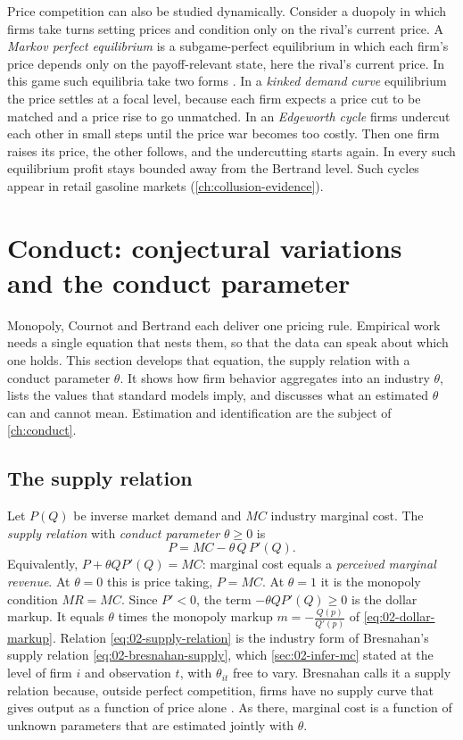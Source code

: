 Price competition can also be studied dynamically. Consider a duopoly in which firms take turns setting prices and
condition only on the rival's current price. A \emph{Markov perfect equilibrium} is a subgame-perfect equilibrium in
which each firm's price depends only on the payoff-relevant state, here the rival's current price. In this game such
equilibria take two forms \citep[pp.~571--572]{MaskinTirole1988}. In a \emph{kinked demand curve} equilibrium the
price settles at a focal level, because each firm expects a price cut to be matched and a price rise to go unmatched.
In an \emph{Edgeworth cycle} firms undercut each other in small steps until the price war becomes too costly. Then
one firm raises its price, the other follows, and the undercutting starts again. In every such equilibrium profit
stays bounded away from the Bertrand level. Such cycles appear in retail gasoline markets
(\cref{ch:collusion-evidence}).

\section{Conduct: conjectural variations and the conduct parameter}\label{sec:02-conduct}

Monopoly, Cournot and Bertrand each deliver one pricing rule. Empirical work needs a single equation that nests them,
so that the data can speak about which one holds. This section develops that equation, the supply relation with a
conduct parameter $\theta$. It shows how firm behavior aggregates into an industry $\theta$, lists the values that
standard models imply, and discusses what an estimated $\theta$ can and cannot mean. Estimation and identification
are the subject of \cref{ch:conduct}.

\subsection{The supply relation}\label{sec:02-supply-relation}

Let $P(Q)$ be inverse market demand and $MC$ industry marginal cost. The \emph{supply relation} with \emph{conduct
parameter} $\theta \ge 0$ is
\begin{equation}\label{eq:02-supply-relation}
P = MC - \theta\, Q\, P'(Q) .
\end{equation}
Equivalently, $P + \theta Q P'(Q) = MC$: marginal cost equals a \emph{perceived marginal revenue}. At $\theta = 0$
this is price taking, $P = MC$. At $\theta = 1$ it is the monopoly condition $MR = MC$. Since $P' < 0$, the term
$-\theta Q P'(Q) \ge 0$ is the dollar markup. It equals $\theta$ times the monopoly markup $m = -\frac{Q(p)}{Q'(p)}$
of \eqref{eq:02-dollar-markup}. Relation \eqref{eq:02-supply-relation} is the industry form of Bresnahan's supply
relation \eqref{eq:02-bresnahan-supply}, which \cref{sec:02-infer-mc} stated at the level of firm $i$ and
observation $t$, with $\theta_{it}$ free to vary. Bresnahan calls it a supply relation because, outside perfect
competition, firms have no supply curve that gives output as a function of price alone
\citep[p.~1016, n.~6]{Bresnahan1989}. As there, marginal cost is a function of unknown parameters that are
estimated jointly with $\theta$.

